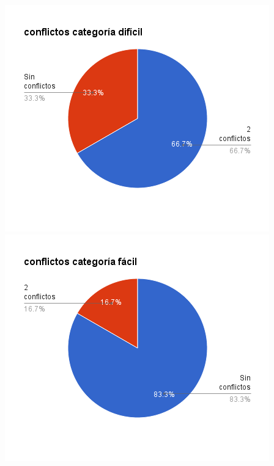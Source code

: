 \documentclass[a4paper,spanish]{article}
\begin{document}
\noindent
\begin{minipage}{0.50\textwidth}
\includegraphics[width=\textwidth]{./graficos/conflictosDificil.png}
\includegraphics[width=\textwidth]{./graficos/conflictosFacil.png}
\label{G}
\end{minipage}
\end{document}
